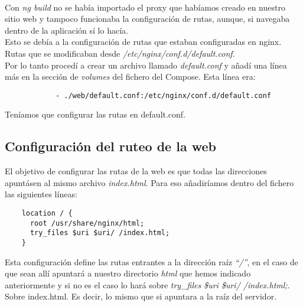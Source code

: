 \\Con \textit{ng build} no se había importado el proxy que habíamos creado en nuestro sitio web y tampoco funcionaba la configuración de rutas, aunque, si navegaba dentro de la aplicación sí lo hacía.
\\Esto se debía a la configuración de rutas que estaban configuradas en nginx. Rutas que se modificaban desde \textit{/etc/nginx/conf.d/default.conf}.
\\Por lo tanto procedí a crear un archivo llamado \textit{default.conf} y añadí una línea más en la sección de \textit{volumes} del fichero del Compose. Esta línea era:
\begin{verbatim}
            - ./web/default.conf:/etc/nginx/conf.d/default.conf
\end{verbatim}
Teníamos que configurar las rutas en default.conf.

\subsection{Configuración del ruteo de la web}
El objetivo de configurar las rutas de la web es que todas las direcciones apuntásen al mismo archivo \textit{index.html}. Para eso añadiríamos dentro del fichero las siguientes líneas:
\begin{verbatim}
    location / {
      root /usr/share/nginx/html;
      try_files $uri $uri/ /index.html;
    }
\end{verbatim}
Esta configuración define las rutas entrantes a la dirección raíz \textit{``/''}, en el caso de que sean allí apuntará a nuestro directorio \textit{html} que hemos indicado anteriormente y si no es el caso lo hará sobre \textit{try\_files \$uri \$uri/ /index.html;}. Sobre index.html. Es decir, lo mismo que si apuntara a la raíz del servidor.

